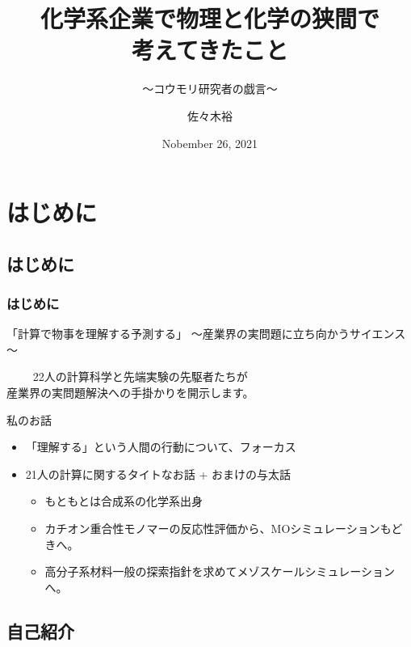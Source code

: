 \documentclass[12pt, dvipdfmx]{beamer}
\title
{化学系企業で物理と化学の狭間で\\考えてきたこと}
\subtitle{～コウモリ研究者の戯言～}
\author[東亞合成　佐々木]{佐々木裕}
\institute[東亞合成]{東亞合成}
\date{Nobember 26, 2021}
\begin{document}
\begin{frame}\frametitle{}
	\titlepage
\end{frame}

\section{はじめに}
\subsection{はじめに}
\begin{frame}
    \frametitle{はじめに}
    \begin{block}{「計算で物事を理解する予測する」}
        ～産業界の実問題に立ち向かうサイエンス～

　　    22人の計算科学と先端実験の先駆者たちが\\産業界の実問題解決への手掛かりを開示します。
    \end{block}
    
    \begin{exampleblock}{私のお話}
        \begin{itemize}
            \item 「理解する」という人間の行動について、フォーカス
            \item 21人の計算に関するタイトなお話 + \alert{おまけの与太話}
            \begin{itemize}
                \item もともとは合成系の化学系出身
                \item カチオン重合性モノマーの反応性評価から、MOシミュレーションもどきへ。
                \item 高分子系材料一般の探索指針を求めてメゾスケールシミュレーションへ。
            \end{itemize}
        \end{itemize}
    \end{exampleblock}
\end{frame}

\subsection{自己紹介}
\end{document}
